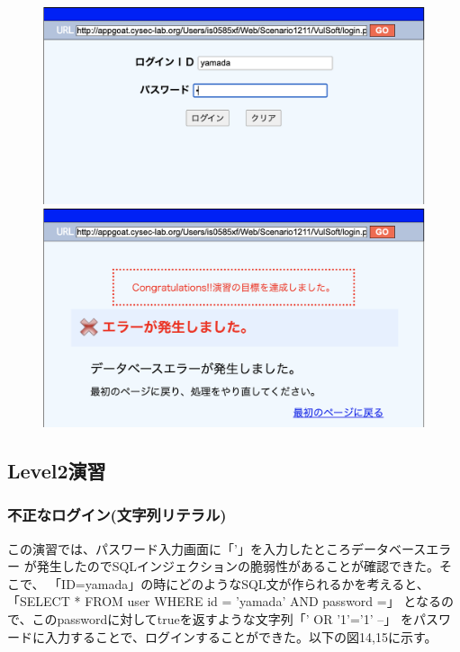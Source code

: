 \documentclass[dvipdfmx,autodetect-engine,titlepage]{jsarticle}
\begin{document}
\begin{figure}[h]
  \centering
  \begin{minipage}[b]{0.45\linewidth}
  \begin{center}
    \includegraphics[keepaspectratio,scale=0.35]{pic12.png}
    \end{center}
    \caption{}
  \end{minipage}
  \begin{minipage}[b]{0.45\linewidth}
  \begin{center}
    \includegraphics[keepaspectratio,scale=0.35]{pic13.png}
    \end{center}
    \caption{}
  \end{minipage}
\end{figure}

\subsection{Level2演習}

\subsubsection*{不正なログイン(文字列リテラル)}
この演習では、パスワード入力画面に「'」を入力したところデータベースエラー
が発生したのでSQLインジェクションの脆弱性があることが確認できた。そこで、
「ID=yamada」の時にどのようなSQL文が作られるかを考えると、
「SELECT * FROM user WHERE id = 'yamada' AND password =」
となるので、このpasswordに対してtrueを返すような文字列「' OR '1'='1' --」
をパスワードに入力することで、ログインすることができた。以下の図14,15に示す。
\end{document}

